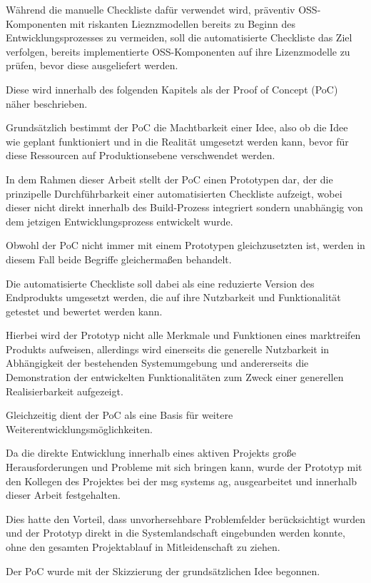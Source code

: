 Während die manuelle Checkliste dafür verwendet wird, präventiv OSS-Komponenten mit riskanten Lieznzmodellen bereits zu Beginn des Entwicklungsprozesses zu vermeiden, soll die automatisierte Checkliste das Ziel verfolgen, bereits implementierte OSS-Komponenten auf ihre Lizenzmodelle zu prüfen, bevor diese ausgeliefert werden. 

Diese wird innerhalb des folgenden Kapitels als der Proof of Concept (PoC) näher beschrieben. 

Grundsätzlich bestimmt der PoC die Machtbarkeit einer Idee, also ob die Idee wie geplant funktioniert und in die Realität umgesetzt werden kann, bevor für diese Ressourcen auf Produktionsebene verschwendet werden.  

In dem Rahmen dieser Arbeit stellt der PoC einen Prototypen dar, der die prinzipelle Durchführbarkeit einer automatisierten Checkliste aufzeigt, wobei dieser nicht direkt innerhalb des Build-Prozess integriert sondern unabhängig von dem jetzigen Entwicklungsprozess entwickelt wurde.  

Obwohl der PoC nicht immer mit einem Prototypen gleichzusetzten ist, werden in diesem Fall beide Begriffe gleichermaßen behandelt. 

Die automatisierte Checkliste soll dabei als eine reduzierte Version des Endprodukts umgesetzt werden, die auf ihre Nutzbarkeit und Funktionalität getestet und bewertet werden kann. 

Hierbei wird der Prototyp nicht alle Merkmale und Funktionen eines marktreifen Produkts aufweisen, allerdings wird einerseits die generelle Nutzbarkeit in Abhängigkeit der bestehenden Systemumgebung und andererseits die Demonstration der entwickelten Funktionalitäten zum Zweck einer generellen Realisierbarkeit aufgezeigt. 

Gleichzeitig dient der PoC als eine Basis für weitere Weiterentwicklungsmöglichkeiten. 

Da die direkte Entwicklung innerhalb eines aktiven Projekts große Herausforderungen und Probleme mit sich bringen kann, wurde der Prototyp mit den Kollegen des Projektes bei der msg systems ag, ausgearbeitet und innerhalb dieser Arbeit festgehalten. 

Dies hatte den Vorteil, dass unvorhersehbare Problemfelder berücksichtigt wurden und der Prototyp direkt in die Systemlandschaft eingebunden werden konnte, ohne den gesamten Projektablauf in Mitleidenschaft zu ziehen.

Der PoC wurde mit der Skizzierung der grundsätzlichen Idee begonnen. 

